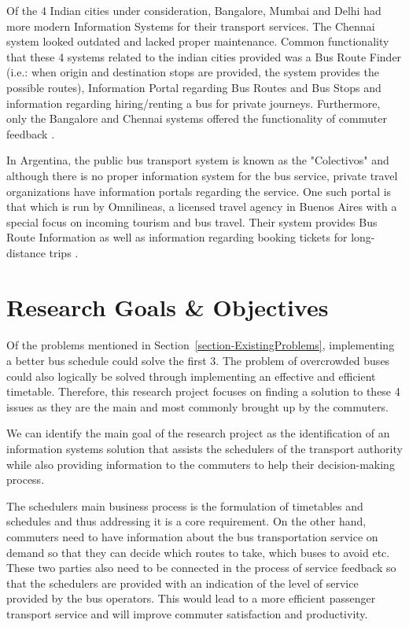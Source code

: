 Of the 4 Indian cities under consideration, Bangalore, Mumbai and Delhi had more modern Information Systems for their transport services. The Chennai system looked outdated and lacked proper maintenance. Common functionality that these 4 systems related to the indian cities provided was a Bus Route Finder (i.e.: when origin and destination stops are provided, the system provides the possible routes), Information Portal regarding Bus Routes and Bus Stops and information regarding hiring/renting a bus for private journeys. Furthermore, only the Bangalore and Chennai systems offered the functionality of commuter feedback \cite{BMTC1997, BEST1995, DTC2012, MTC2001}.

In Argentina, the public bus transport system is known as the "Colectivos" and although there is no proper information system for the bus service, private travel organizations have information portals regarding the service. One such portal is that which is run by Omnilineas, a licensed travel agency in Buenos Aires with a special focus on incoming tourism and bus travel. Their system provides Bus Route Information as well as information regarding booking tickets for long-distance trips \cite{Omnilineas2013}.



\section{Research Goals \& Objectives}
\label{section-ResearchGoalsAndObjectives}

\paragraph{ } Of the problems mentioned in Section~\ref{section-ExistingProblems}, implementing a better bus schedule could solve the first 3. The problem of overcrowded buses could also logically be solved through implementing an effective and efficient timetable. Therefore, this research project focuses on finding a solution to these 4 issues as they are the main and most commonly brought up by the commuters.

We can identify the main goal of the research project as the identification of an information systems solution that assists the schedulers of the transport authority while also providing information to the commuters to help their decision-making process. 

The schedulers main business process is the formulation of timetables and schedules and thus addressing it is a core requirement. On the other hand, commuters need to have information about the bus transportation service on demand so that they can decide which routes to take, which buses to avoid etc. These two parties also need to be connected in the process of service feedback so that the schedulers are provided with an indication of the level of service provided by the bus operators. This would lead to a more efficient passenger transport service and will improve commuter satisfaction and productivity.




